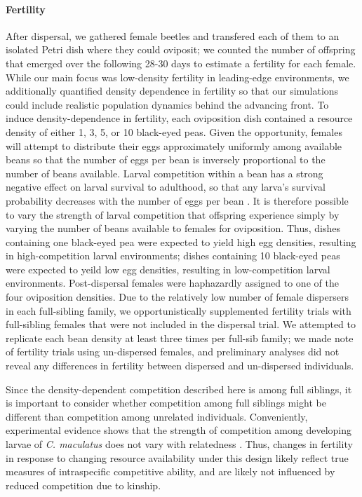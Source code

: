 \documentclass[11pt]{article}
\newcommand{\revise}[1]{{\color{Mahogany}{#1}}}
\begin{document}
\paragraph{Fertility}
After dispersal, we gathered female beetles and transfered each of them to an isolated Petri dish \revise{with one unrelated male} where they could \revise{mate and} oviposit; we counted the number of offspring that emerged over the following 28-30 days to estimate a fertility for each female.
While our main focus was low-density fertility in leading-edge environments, we additionally quantified density dependence in fertility so that our simulations could include realistic population dynamics behind the advancing front.
To induce density-dependence in fertility, each oviposition dish contained a resource density of either 1, 3, 5, or 10 black-eyed peas.
Given the opportunity, females will attempt to distribute their eggs approximately uniformly among available beans \citep{fujii_behavioral_1990} so that the number of eggs per bean is inversely proportional to the number of beans available.
Larval competition within a bean has a strong negative effect on larval survival to adulthood, so that any larva's survival probability decreases with the number of eggs per bean \citep{giga_intraspecific_1991}.
It is therefore possible to vary the strength of larval competition that offspring experience simply by varying the number of beans available to females for oviposition.
Thus, dishes containing one black-eyed pea were expected to yield high egg densities, resulting in high-competition larval environments; dishes containing 10 black-eyed peas were expected to yeild low egg densities, resulting in low-competition larval environments.
Post-dispersal females were haphazardly assigned to one of the four oviposition densities.
Due to the relatively low number of female dispersers in each full-sibling family, we opportunistically supplemented fertility trials with full-sibling females that were not included in the dispersal trial.
We attempted to replicate each bean density at least three times per full-sib family; we made note of fertility trials using un-dispersed females, and preliminary analyses did not reveal any differences in fertility between dispersed and un-dispersed individuals.

Since the density-dependent competition described here is among full siblings, it is important to consider whether competition among full siblings might be different than competition among unrelated individuals.
Conveniently, experimental evidence shows that the strength of competition among developing larvae of \textit{C. maculatus} does not vary with relatedness \citep{smallegange_local_2008}.
Thus, changes in fertility in response to changing resource availability under this design likely reflect true measures of intraspecific competitive ability, and are likely not influenced by reduced competition due to kinship.
\end{document}
